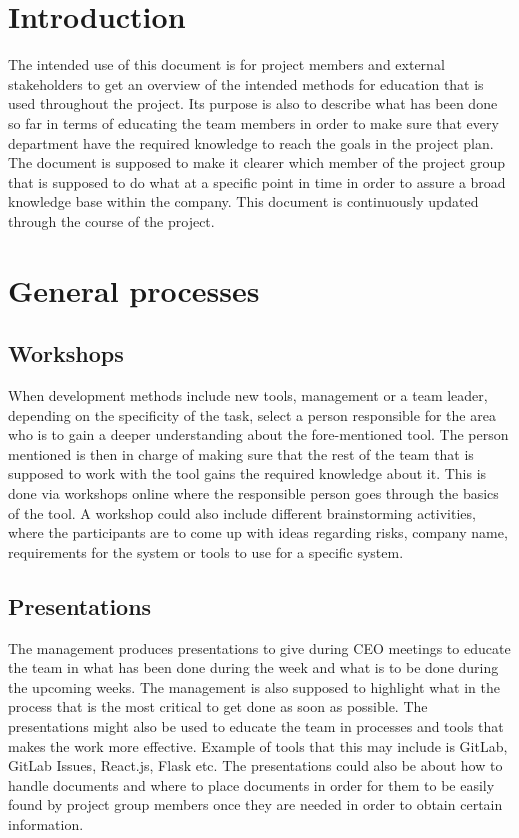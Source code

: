 \documentclass[12pt]{article}
\begin{document}
\section{Introduction}
The intended use of this document is for project members and external stakeholders to get an overview of the intended methods for education that is used throughout the project. Its purpose is also to describe what has been done so far in terms of educating the team members in order to make sure that every department have the required knowledge to reach the goals in the project plan. The document is supposed to make it clearer which member of the project group that is supposed to do what at a specific point in time in order to assure a broad knowledge base within the company. This document is continuously updated through the course of the project. 

\section{General processes}
    \subsection{Workshops}
  When development methods include new tools, management or a team leader, depending on the specificity of the task, select a person responsible for the area who is to gain a deeper understanding about the fore-mentioned tool. The person mentioned is then in charge of making sure that the rest of the team that is supposed to work with the tool gains the required knowledge about it. This is done via workshops online where the responsible person goes through the basics of the tool.  A workshop could also include different brainstorming activities, where the participants are to come up with ideas regarding risks, company name, requirements for the system or tools to use for a specific system.
  
    \subsection{Presentations}
The management produces presentations to give during CEO meetings to educate the team in what has been done during the week and what is to be done during the upcoming weeks. The management is also supposed to highlight what in the process that is the most critical to get done as soon as possible. The presentations might also be used to educate the team in processes and tools that makes the work more effective. Example of tools that this may include is GitLab, GitLab Issues, React.js, Flask etc. The presentations could also be about how to handle documents and where to place documents in order for them to be easily found by project group members once they are needed in order to obtain certain information. 
\end{document}
